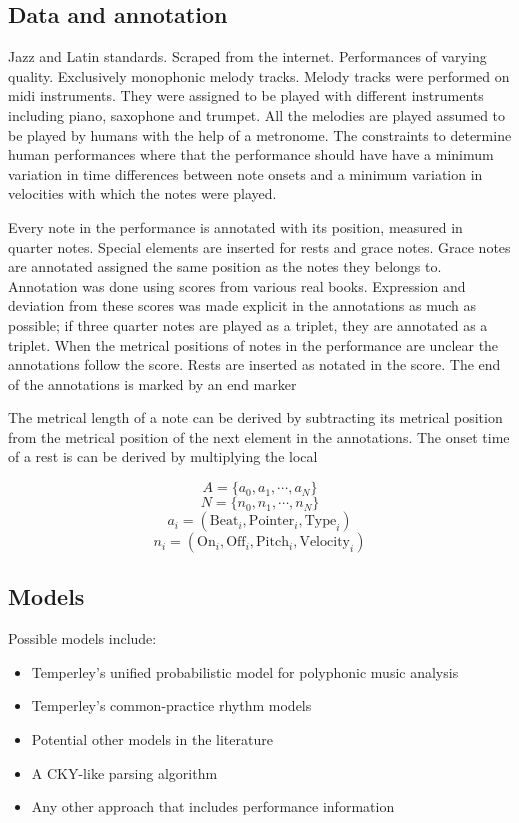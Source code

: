 \documentclass[a4paper,10pt]{article}
\begin{document}
\subsection{Data and annotation}

Jazz and Latin standards. Scraped from the internet. Performances of varying quality. Exclusively monophonic melody tracks. Melody tracks were performed on midi instruments. They were assigned to be played with different instruments including piano, saxophone and trumpet. All the melodies are played assumed to be played by humans with the help of a metronome. The constraints to determine human performances where that the performance should have have a minimum variation in time differences between note onsets and a minimum variation in velocities with which the notes were played.

Every note in the performance is annotated with its position, measured in quarter notes. Special elements are inserted for rests and grace notes. Grace notes are annotated assigned the same position as the notes they belongs to. Annotation was done using scores from various real books. Expression and deviation from these scores was made explicit in the annotations as much as possible; if three quarter notes are played as a triplet, they are annotated as a triplet. When the metrical positions of notes in the performance are unclear the annotations follow the score. Rests are inserted as notated in the score. The end of the annotations is marked by an end marker

The metrical length of a note can be derived by subtracting its metrical position from the metrical position of the next element in the annotations. The onset time of a rest is can be derived by multiplying the local 

\[A = \{a_0, a_1, \cdots, a_N\}\]
\[N = \{n_0, n_1, \cdots, n_N\}\]
\[a_i = (\mathrm{Beat}_i, \mathrm{Pointer}_i, \mathrm{Type}_i)\]
\[n_i = (\mathrm{On}_i, \mathrm{Off}_i, \mathrm{Pitch}_i, \mathrm{Velocity}_i)\]

\subsection{Models}

Possible models include:
\begin{itemize}
\item Temperley's unified probabilistic model for polyphonic music analysis
\item Temperley's common-practice rhythm models
\item Potential other models in the literature
\item A CKY-like parsing algorithm 
\item Any other approach that includes performance information
\end{itemize}
\end{document}
